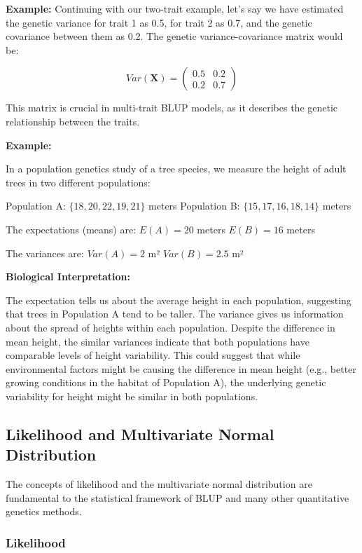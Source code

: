 \documentclass[12pt,a4paper]{article}
\newenvironment{example}[1][]
{\begin{basebox}[linecolor=uqgold]
\textbf{\color{uqgold}Example:} \textit{#1}\par\noindent\ignorespaces}
{\end{basebox}}
\newenvironment{interpretation}[1][]
{\begin{basebox}[linecolor=uqgreen]
\textbf{\color{uqgreen}Biological Interpretation:} \textit{#1}\par\noindent\ignorespaces}
{\end{basebox}}
\begin{document}
\textbf{Example:}
Continuing with our two-trait example, let's say we have estimated the genetic variance for trait 1 as 0.5, for trait 2 as 0.7, and the genetic covariance between them as 0.2. The genetic variance-covariance matrix would be:

$$Var(\mathbf{X}) = \begin{pmatrix} 0.5 & 0.2 \\ 0.2 & 0.7 \end{pmatrix}$$

This matrix is crucial in multi-trait BLUP models, as it describes the genetic relationship between the traits.

\begin{example}
In a population genetics study of a tree species, we measure the height of adult trees in two different populations:

Population A: $\{18, 20, 22, 19, 21\}$ meters
Population B: $\{15, 17, 16, 18, 14\}$ meters

The expectations (means) are:
$E(A) = 20$ meters
$E(B) = 16$ meters

The variances are:
$Var(A) = 2$ m²
$Var(B) = 2.5$ m²
\end{example}

\begin{interpretation}
The expectation tells us about the average height in each population, suggesting that trees in Population A tend to be taller. The variance gives us information about the spread of heights within each population. Despite the difference in mean height, the similar variances indicate that both populations have comparable levels of height variability. This could suggest that while environmental factors might be causing the difference in mean height (e.g., better growing conditions in the habitat of Population A), the underlying genetic variability for height might be similar in both populations.
\end{interpretation}

\subsection{Likelihood and Multivariate Normal Distribution}

The concepts of likelihood and the multivariate normal distribution are fundamental to the statistical framework of BLUP and many other quantitative genetics methods.

\subsubsection{Likelihood}
\end{document}
